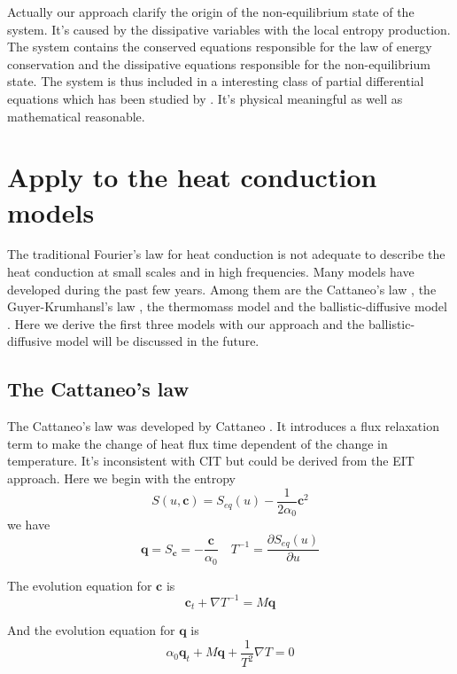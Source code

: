 \documentclass[a4paper]{article}
\begin{document}
Actually our approach clarify the origin of the non-equilibrium state of the system. It's caused by the dissipative variables with the local entropy production. The system contains the conserved equations responsible for the law of energy conservation and the dissipative equations responsible for the non-equilibrium state. The system is thus included in a interesting class of partial differential equations which has been studied by \cite{yong2008interesting}. It's physical meaningful as well as mathematical reasonable.

\section{Apply to the heat conduction models}
The traditional Fourier's law for heat conduction is not adequate to describe the heat conduction at small scales and in high frequencies. Many models have developed during the past few years. Among them are the Cattaneo's law \cite{cattaneo2011sulla}, the Guyer-Krumhansl's law \cite{guyer1966solution}, the thermomass model \cite{zeng2006motion,dong2011generalized} and the ballistic-diffusive model \cite{chen2002ballistic,chen2001ballistic}. Here we derive the first three models with our approach and the ballistic-diffusive model will be discussed in the future. 

\subsection{The Cattaneo's law}

The Cattaneo's law was developed by Cattaneo \cite{cattaneo2011sulla}. It introduces a flux relaxation term to make the change of heat flux time dependent of the change in temperature. It's inconsistent with CIT but could be derived from the EIT approach. Here we begin with the entropy 
\begin{equation}
S(u,\mathbf{c})=S_{eq}(u)-\frac{1}{2\alpha_0} \mathbf{c}^2
\end{equation}
we have
\begin{equation}
\mathbf{q}=S_{\mathbf{c}}=-\frac{\mathbf{c}}{\alpha_0} \quad T^{-1}=\frac{\partial S_{eq}(u)}{\partial u}
\end{equation}

The evolution equation for $\mathbf{c}$ is 
\begin{equation}
\mathbf{c}_t+\nabla T^{-1} =M\mathbf{q}
\end{equation}

And the evolution equation for $\mathbf{q}$ is
\begin{equation}
{\alpha_0}\mathbf{q}_t + M \mathbf{q} + \frac{1}{T^2} \nabla T=0
\end{equation}
\end{document}
